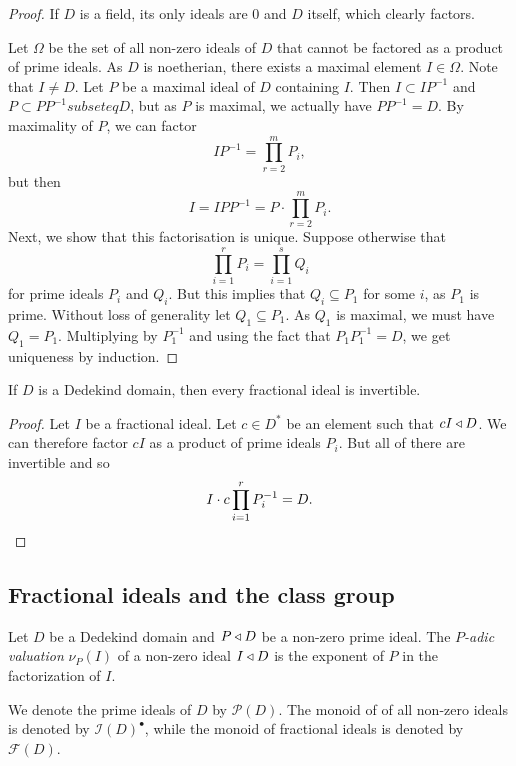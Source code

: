 \begin{proof}
If $D$ is a field, its only ideals are $0$ and $D$ itself, which
clearly factors.

Let $\Omega$ be the set of all non-zero ideals of $D$ that cannot
be factored as a product of prime ideals. As $D$ is noetherian,
there exists a maximal element $I \in \Omega$. Note that $I \ne D$.
Let $P$ be a maximal ideal of $D$ containing $I$. Then
$I \subset I P^{-1}$ and $P \subset P P^{-1} subseteq D$, but as
$P$ is maximal, we actually have $P P^{-1} = D$. By maximality of
$P$, we can factor
\[
I P^{-1} = \prod_{r=2}^m P_i,
\]
but then
\[
I = I P P^{-1} = P \cdot \prod_{r=2}^m P_i.
\]
Next, we show that this factorisation is unique. Suppose otherwise
that
\[
\prod_{i=1}^r P_i = \prod_{i=1}^s Q_i
\]
for prime ideals $P_i$ and $Q_i$. But this implies that
$Q_i \subseteq P_1$ for some $i$, as $P_1$ is prime. Without loss
of generality let $Q_1 \subseteq P_1$. As $Q_1$ is maximal, we must
have $Q_1 = P_1$. Multiplying by $P_1^{-1}$ and using the fact that
$P_1 P_1^{-1} = D$, we get uniqueness by induction.
\end{proof}

\begin{posledica}
If $D$ is a Dedekind domain, then every fractional ideal is
invertible.
\end{posledica}

\begin{proof}
Let $I$ be a fractional ideal. Let $c \in D^*$ be an element such
that $cI \triangleleft D$. We can therefore factor $cI$ as a product of
prime ideals $P_i$. But all of there are invertible and so
\[
I \cdot c \prod_{i=1}^r P_i^{-1} = D. \qedhere
\]
\end{proof}

\newpage

\subsection{Fractional ideals and the class group}

\begin{definicija}
Let $D$ be a Dedekind domain and $P \triangleleft D$ be a non-zero prime
ideal. The
\emph{$P$-adic valuation}
$\nu_P(I)$ of a non-zero ideal $I \triangleleft D$ is the exponent of $P$ in
the factorization of $I$.
\end{definicija}

\begin{opomba}
We denote the prime ideals of $D$ by $\mathcal{P}(D)$. The monoid
of of all non-zero ideals is denoted by $\mathcal{I}(D)^\bullet$,
while the monoid of fractional ideals is denoted by
$\mathcal{F}(D)$.
\end{opomba}

